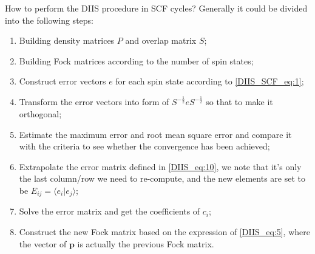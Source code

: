 How to perform the DIIS procedure in SCF cycles? Generally it could be divided into the 
following steps:
\begin{enumerate}
 \item Building density matrices $P$ and overlap matrix $S$;
 \item Building Fock matrices according to the number of spin states;
 \item Construct error vectors $e$ for each spin state according to \ref{DIIS_SCF_eq:1};
 \item Transform the error vectors into form of $S^{-\frac{1}{2}}eS^{-\frac{1}{2}}$ so that
 to make it orthogonal;
 \item Estimate the maximum error and root mean square error and compare it with the criteria 
 to see whether the convergence has been achieved;
 \item Extrapolate the error matrix defined in \ref{DIIS_eq:10}, we note that it's only the 
 last column/row we need to re-compute, and the new elements are set to be $ E_{ij} = 
 \langle e_{i}|e_{j}\rangle$;
 \item Solve the error matrix and get the coefficients of $c_{i}$;
 \item Construct the new Fock matrix based on the expression of \ref{DIIS_eq:5}, where the 
 vector of $\mathbf{p}$ is actually the previous Fock matrix.
\end{enumerate}










